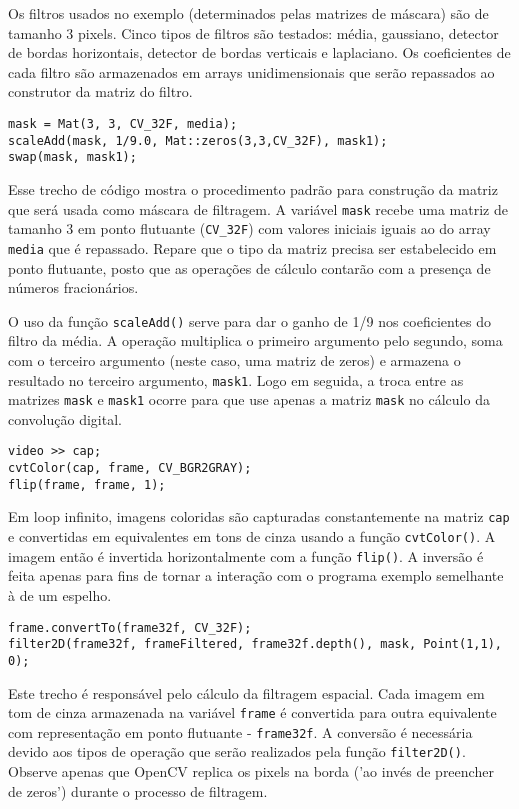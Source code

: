 \documentclass[11pt]{amsbook}
\begin{document}
Os filtros usados no exemplo (determinados pelas matrizes de máscara)
são de tamanho 3  pixels. Cinco tipos de filtros são
testados: média, gaussiano, detector de bordas horizontais, detector de
bordas verticais e laplaciano. Os coeficientes de cada filtro são
armazenados em arrays unidimensionais que serão repassados ao
construtor da matriz do filtro.


\begin{verbatim}
mask = Mat(3, 3, CV_32F, media);
scaleAdd(mask, 1/9.0, Mat::zeros(3,3,CV_32F), mask1);
swap(mask, mask1);
\end{verbatim}

Esse trecho de código mostra o procedimento padrão para construção da
matriz que será usada como máscara de filtragem. A variável \texttt{mask}
recebe uma matriz de tamanho 3  em ponto flutuante
(\texttt{CV_32F}) com valores iniciais iguais ao do array \texttt{media} que é
repassado. Repare que o tipo da matriz precisa ser estabelecido em
ponto flutuante, posto que as operações de cálculo contarão com a
presença de números fracionários.


O uso da função \texttt{scaleAdd()} serve para dar o ganho de 1/9 nos
coeficientes do filtro da média. A operação multiplica o primeiro
argumento pelo segundo, soma com o terceiro argumento (neste caso, uma
matriz de zeros) e armazena o resultado no terceiro argumento,
\texttt{mask1}. Logo em seguida, a troca entre as matrizes \texttt{mask} e \texttt{mask1}
ocorre para que use apenas a matriz \texttt{mask} no cálculo da convolução
digital.


\begin{verbatim}
video >> cap;
cvtColor(cap, frame, CV_BGR2GRAY);
flip(frame, frame, 1);
\end{verbatim}

Em loop infinito, imagens coloridas são capturadas constantemente na
matriz \texttt{cap} e convertidas em equivalentes em tons de cinza usando a
função \texttt{cvtColor()}. A imagem então é invertida horizontalmente com a
função \texttt{flip()}. A inversão é feita apenas para fins de tornar a
interação com o programa exemplo semelhante à de um espelho.


\begin{verbatim}
frame.convertTo(frame32f, CV_32F);
filter2D(frame32f, frameFiltered, frame32f.depth(), mask, Point(1,1), 0);
\end{verbatim}

Este trecho é responsável pelo cálculo da filtragem espacial. Cada
imagem em tom de cinza armazenada na variável \texttt{frame} é convertida
para outra equivalente com representação em ponto flutuante -
\texttt{frame32f}. A conversão é necessária devido aos tipos de operação que
serão realizados pela função \texttt{filter2D()}. Observe apenas que OpenCV
replica os pixels na borda ('ao invés de preencher de zeros') durante
o processo de filtragem.
\end{document}

